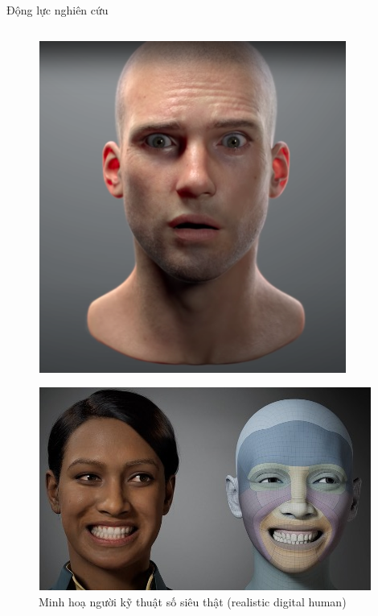 \documentclass[10pt,mathserif]{beamer}
\begin{document}
\begin{frame}{Động lực nghiên cứu}
\begin{columns}
	\begin{column}{0.3\textwidth}
		\begin{figure}
				\includegraphics[width=\textwidth]{UniversalHuman.png}
		\end{figure}
		
		\begin{figure}
			\includegraphics[width=\textwidth]{MetaHuman.jpg}
			\caption{\small Minh hoạ người kỹ thuật số siêu thật (realistic digital human)}
		\end{figure}
	
	\end{column}
	
	\end{columns}
\end{frame}
\end{document}
